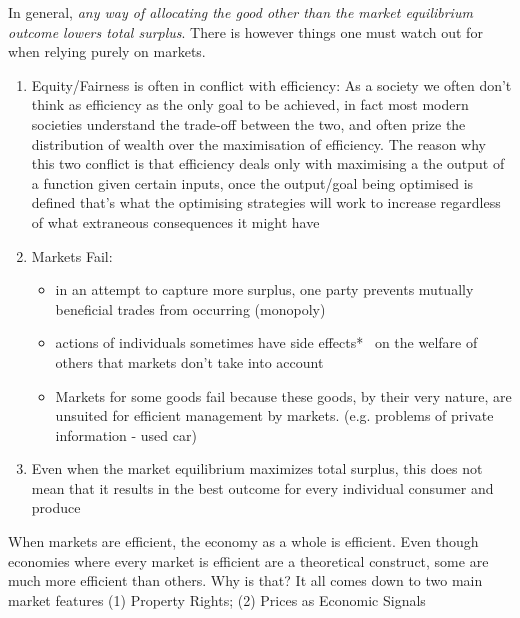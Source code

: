 \documentclass[english,course, draft]{Notes}
\newcommand{\ita}[1]{\textit{#1}}
\begin{document}
\par{In general, \ita{any way of allocating the good other than the market equilibrium outcome lowers total surplus}. There is however things one must watch out for when relying purely on markets.}

\begin{enumerate}
	\item Equity/Fairness is often in conflict with efficiency: As a society we often don't think as efficiency as the only goal to be achieved, in fact most modern societies understand the trade-off between the two, and often prize the distribution of wealth over the maximisation of efficiency. The reason why this two conflict is that efficiency deals only with maximising a the output of a function given certain inputs, once the output/goal being optimised is defined that's what the optimising strategies will work to increase regardless of what extraneous consequences it might have
	
	\item Markets Fail: 
		\begin{itemize}
		\item in an attempt to capture more surplus, one party prevents mutually beneficial trades from occurring (monopoly)
		\item actions of individuals sometimes have side effects*~ on the welfare of others that markets don't take into account
		\item Markets for some goods fail because these goods, by their very nature, are unsuited for efficient management by markets. (e.g. problems of private information - used car)
		\end{itemize}
		
	\item Even when the market equilibrium maximizes total surplus, this does not mean that it results in the best outcome for every individual consumer and produce
\end{enumerate}

\par{When markets are efficient, the economy as a whole is efficient. Even though economies where every market is efficient are a theoretical construct, some are much more efficient than others. Why is that? It all comes down to two main market features (1) Property Rights; (2) Prices as Economic Signals }

\end{document}
